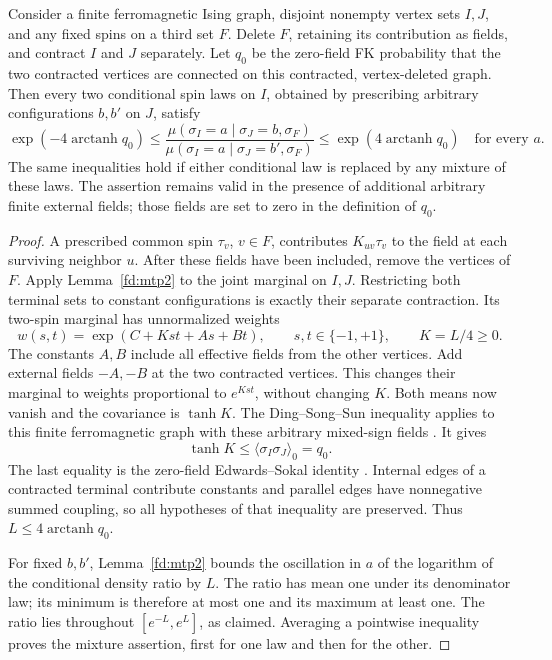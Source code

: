 \begin{lemma}
\label{fd:ratio}
Consider a finite ferromagnetic Ising graph, disjoint nonempty vertex sets
\(I,J\), and any fixed spins on a third set \(F\).
Delete \(F\), retaining its contribution as fields, and contract \(I\)
and \(J\) separately.  Let \(q_0\) be the zero-field FK probability that
the two contracted vertices are connected on this contracted, vertex-deleted
graph.  Then every two conditional spin laws on \(I\), obtained by
prescribing arbitrary configurations \(b,b'\) on \(J\), satisfy
\begin{equation}
 \exp(-4\operatorname{arctanh}q_0)
 \le\frac{\mu(\sigma_I=a\mid\sigma_J=b,\sigma_F)}
            {\mu(\sigma_I=a\mid\sigma_J=b',\sigma_F)}
 \le\exp(4\operatorname{arctanh}q_0)
 \quad\text{for every }a.
 \label{fd:pointwise-ratio}
\end{equation}
The same inequalities hold if either conditional law is replaced by any
mixture of these laws.  The assertion remains valid in the presence of
additional arbitrary finite external fields; those fields are set to zero
in the definition of \(q_0\).
\end{lemma}

\begin{proof}
A prescribed common spin $\tau_v$, $v\in F$, contributes
$K_{uv}\tau_v$ to the field at each surviving neighbor $u$.
After these fields have been included, remove the vertices of $F$.
Apply Lemma~\ref{fd:mtp2} to the joint marginal on \(I,J\).
Restricting both terminal sets to constant configurations is exactly their
separate contraction.  Its two-spin marginal has unnormalized weights
\[
 w(s,t)=\exp(C+Kst+As+Bt),\qquad s,t\in\{-1,+1\},
 \qquad K=L/4\ge0.
\]
The constants \(A,B\) include all effective fields from the other vertices.
Add external fields \(-A,-B\) at the two contracted vertices.  This changes
their marginal to weights proportional to \(e^{Kst}\), without changing
\(K\).  Both means now vanish and the covariance is \(\tanh K\).
The Ding--Song--Sun inequality applies to this finite ferromagnetic graph
with these arbitrary mixed-sign fields
\cite[Corollary~1.3]{DSS2023}.  It gives
\[
 \tanh K\le\langle\sigma_I\sigma_J\rangle_0=q_0.
\]
The last equality is the zero-field Edwards--Sokal identity
\cite{EdwardsSokal1988}.
Internal edges of a contracted terminal contribute constants and parallel
edges have nonnegative summed coupling, so all hypotheses of that
inequality are preserved.  Thus \(L\le4\operatorname{arctanh}q_0\).

For fixed \(b,b'\), Lemma~\ref{fd:mtp2} bounds the oscillation in \(a\)
of the logarithm of the conditional density ratio by \(L\).
The ratio has mean one under its denominator law; its minimum is therefore
at most one and its maximum at least one.  The ratio lies throughout
\([e^{-L},e^L]\), as claimed.  Averaging a pointwise inequality proves the
mixture assertion, first for one law and then for the other.
\end{proof}

